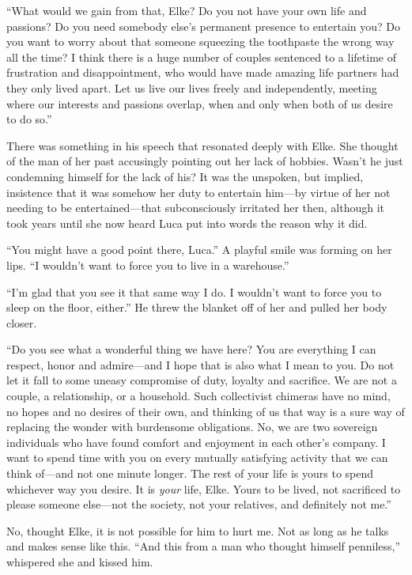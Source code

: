``What would we gain from that, Elke? Do you not have your own life and passions? Do you need somebody else's permanent presence to entertain you? Do you want to worry about that someone squeezing the toothpaste the wrong way all the time? I think there is a huge number of couples sentenced to a lifetime of frustration and disappointment, who would have made amazing life partners had they only lived apart. Let us live our lives freely and independently, meeting where our interests and passions overlap, when and only when both of us desire to do so.''

There was something in his speech that resonated deeply with Elke. She thought of the man of her past accusingly pointing out her lack of hobbies. Wasn't he just condemning himself for the lack of his? It was the unspoken, but implied, insistence that it was somehow her duty to entertain him---by virtue of her not needing to be entertained---that subconsciously irritated her then, although it took years until she now heard Luca put into words the reason why it did.

``You might have a good point there, Luca.'' A playful smile was forming on her lips. ``I wouldn't want to force you to live in a warehouse.''

``I'm glad that you see it that same way I do. I wouldn't want to force you to sleep on the floor, either.'' He threw the blanket off of her and pulled her body closer.

``Do you see what a wonderful thing we have here? You are everything I can respect, honor and admire---and I hope that is also what I mean to you. Do not let it fall to some uneasy compromise of duty, loyalty and sacrifice. We are not a couple, a relationship, or a household. Such collectivist chimeras have no mind, no hopes and no desires of their own, and thinking of us that way is a sure way of replacing the wonder with burdensome obligations. No, we are two sovereign individuals who have found comfort and enjoyment in each other's company. I want to spend time with you on every mutually satisfying activity that we can think of---and not one minute longer. The rest of your life is yours to spend whichever way you desire. It is \emph{your} life, Elke. Yours to be lived, not sacrificed to please someone else---not the society, not your relatives, and definitely not me.''

No, thought Elke, it is not possible for him to hurt me. Not as long as he talks and makes sense like this. ``And this from a man who thought himself penniless,'' whispered she and kissed him.

